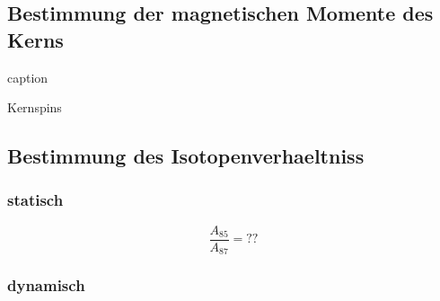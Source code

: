 \subsection{Bestimmung der magnetischen Momente des Kerns}%
\label{sub:bestimmung_der_magnetischen_momente_des_kerns}

\begin{table}[h]
	\centering
	\caption{caption}
	\label{tab:label}
	
\end{table}

\begin{table}[h]
	\centering
	\caption{Kernspins}
	\label{tab:label}
	
\end{table}

\subsection{Bestimmung des Isotopenverhaeltniss}%
\label{sub:bestimmung_des_isotopenverhaeltniss}

\subsubsection{statisch}%
\label{ssub:statisch}

\begin{equation}
	\frac{A_{85}}{A_{87}} = ??
\end{equation}

\subsubsection{dynamisch}%
\label{ssub:dynamisch}


